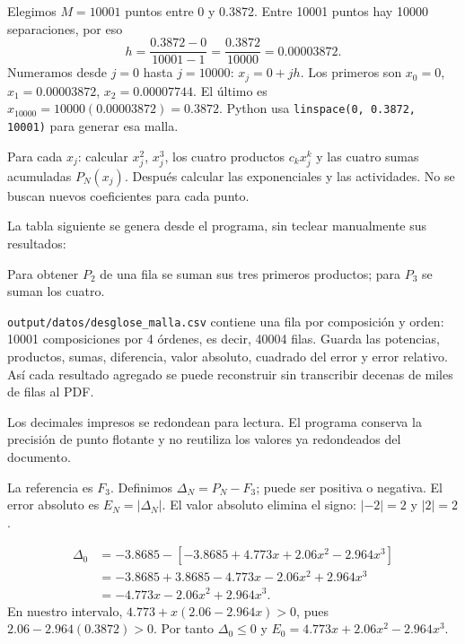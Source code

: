 Elegimos $M=10001$ puntos entre 0 y 0.3872. Entre 10001 puntos hay 10000 separaciones, por eso
\[
h=\frac{0.3872-0}{10001-1}=\frac{0.3872}{10000}=0.00003872.
\]
Numeramos desde $j=0$ hasta $j=10000$: $x_j=0+jh$. Los primeros son $x_0=0$, $x_1=0.00003872$, $x_2=0.00007744$. El último es $x_{10000}=10000(0.00003872)=0.3872$. Python usa \texttt{linspace(0, 0.3872, 10001)} para generar esa malla.

Para cada $x_j$: calcular $x_j^2$, $x_j^3$, los cuatro productos $c_kx_j^k$ y las cuatro sumas acumuladas $P_N(x_j)$. Después calcular las exponenciales y las actividades. No se buscan nuevos coeficientes para cada punto.

La tabla siguiente se genera desde el programa, sin teclear manualmente sus resultados:
\begin{center}\small\end{center}
Para obtener $P_2$ de una fila se suman sus tres primeros productos; para $P_3$ se suman los cuatro.
\begin{center}\end{center}

\texttt{output/datos/desglose\_malla.csv} contiene una fila por composición y orden: 10001 composiciones por 4 órdenes, es decir, 40004 filas. Guarda las potencias, productos, sumas, diferencia, valor absoluto, cuadrado del error y error relativo. Así cada resultado agregado se puede reconstruir sin transcribir decenas de miles de filas al PDF.

Los decimales impresos se redondean para lectura. El programa conserva la precisión de punto flotante y no reutiliza los valores ya redondeados del documento.

La referencia es $F_3$. Definimos $\Delta_N=P_N-F_3$; puede ser positiva o negativa. El error absoluto es $E_N=|\Delta_N|$. El valor absoluto elimina el signo: $|-2|=2$ y $|2|=2$.

\begin{align*}
\Delta_0&=-3.8685-[-3.8685+4.773x+2.06x^2-2.964x^3]\\
&=-3.8685+3.8685-4.773x-2.06x^2+2.964x^3\\
&=-4.773x-2.06x^2+2.964x^3.
\end{align*}
En nuestro intervalo, $4.773+x(2.06-2.964x)>0$, pues $2.06-2.964(0.3872)>0$. Por tanto $\Delta_0\leq0$ y $E_0=4.773x+2.06x^2-2.964x^3$.

